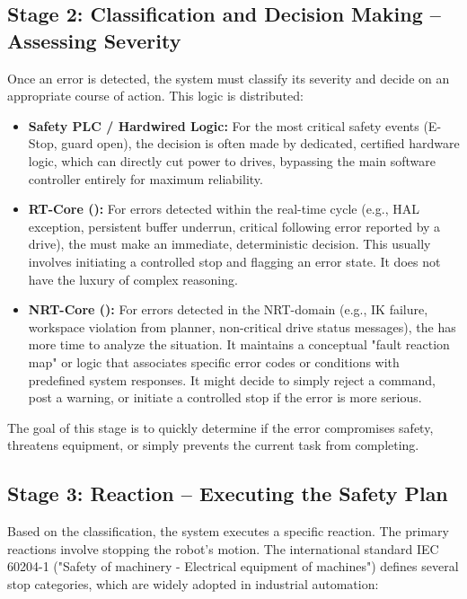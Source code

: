 \subsection{Stage 2: Classification and Decision Making – Assessing Severity}
\label{subsec:classification_stage}
Once an error is detected, the system must classify its severity and decide on an appropriate course of action. This logic is distributed:
\begin{itemize}
    \item \textbf{Safety PLC / Hardwired Logic:} For the most critical safety events (E-Stop, guard open), the decision is often made by dedicated, certified hardware logic, which can directly cut power to drives, bypassing the main software controller entirely for maximum reliability.
    \item \textbf{RT-Core ():} For errors detected within the real-time cycle (e.g., HAL exception, persistent buffer underrun, critical following error reported by a drive), the  must make an immediate, deterministic decision. This usually involves initiating a controlled stop and flagging an error state. It does not have the luxury of complex reasoning.
    \item \textbf{NRT-Core ():} For errors detected in the NRT-domain (e.g., IK failure, workspace violation from planner, non-critical drive status messages), the  has more time to analyze the situation. It maintains a conceptual "fault reaction map" or logic that associates specific error codes or conditions with predefined system responses. It might decide to simply reject a command, post a warning, or initiate a controlled stop if the error is more serious.
\end{itemize}
The goal of this stage is to quickly determine if the error compromises safety, threatens equipment, or simply prevents the current task from completing.

\subsection{Stage 3: Reaction – Executing the Safety Plan}
\label{subsec:reaction_stage}
Based on the classification, the system executes a specific reaction. The primary reactions involve stopping the robot's motion. The international standard IEC 60204-1 ("Safety of machinery - Electrical equipment of machines") defines several stop categories, which are widely adopted in industrial automation:



